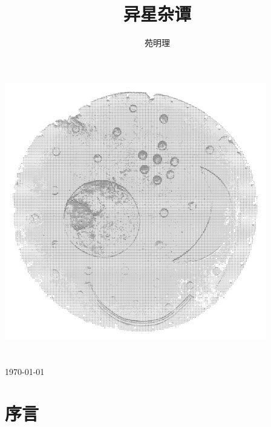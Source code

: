 \documentclass[a4paper,10.5pt]{book}
\title{异星杂谭}
\author{苑明理}
\date{}
\begin{document}

\makeatletter
    \begin{titlepage}
        \begin{center}
            \includegraphics[width=4.5in]{images/0_00-Cover.png}\\[10ex]
            {\erhao \bfseries  \@title }\\[50ex]
            {\sanhao  \@author}\\[5ex]
            {\sihao \monthyeardate\today}\\[1ex]
        \end{center}
    \end{titlepage}
\makeatother
\thispagestyle{empty}
\newpage

\newpage
\thispagestyle{empty}
\maketitle
\begin{center}
    \ccbysa
\end{center}
\thispagestyle{empty}

\newpage

\setlength{\parindent}{0em}
\setlength{\parskip}{1em}

\chapter*{序言}
\end{document}
